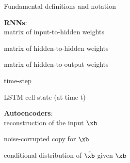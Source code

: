 \begin{frame}   {Fundamental definitions and notation}
    
    \textbf{RNNs}:\\
      \hspace{1cm}matrix of input-to-hidden weights\par
    \makebox[4cm]{$\Wmat$}  \hspace{1cm}matrix of hidden-to-hidden weights\par
      \hspace{1cm}matrix of hidden-to-output weights\par
      \hspace{1cm}time-step\par
      \hspace{1cm}LSTM cell state (at time t)\par
    
    \vspace{3mm}
    
    \textbf{Autoencoders}:\\
      \hspace{1cm}reconstruction of the input $\xb$\par
    \makebox[4cm]{$\tilde{\xb}$}  \hspace{1cm}noise-corrupted copy for $\xb$\par
      \hspace{1cm}conditional distribution of $\tilde{\xb}$ given $\xb$\par
    
    
\end{frame}


\endlecture

